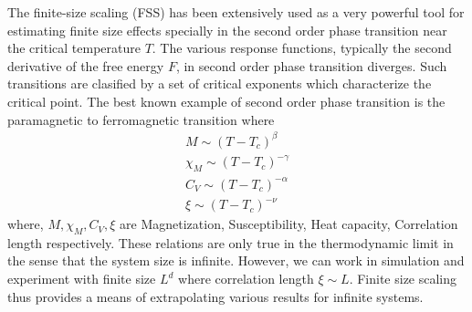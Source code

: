 	The finite-size scaling (FSS) \cite{Elsevier1988} has been extensively used as a very powerful tool for estimating finite size effects specially in the second order phase transition near the critical temperature $T$. The various response functions, typically the second derivative of the free energy $F$, in second order phase transition diverges. Such transitions are clasified by a set of critical exponents which characterize the critical point. The best known example of second order phase transition is the paramagnetic to ferromagnetic transition where
	\begin{align}
		M \sim (T-T_c)^\beta \\
		\chi_M \sim (T-T_c)^{-\gamma} \\
		C_V \sim (T-T_c)^{-\alpha} \\
		\xi \sim (T-T_c)^{-\nu}
	\end{align}
	where, $M, \chi_M, C_V, \xi$ are Magnetization, Susceptibility, Heat capacity, Correlation length respectively. These relations are only true in the thermodynamic limit in the sense that the system size is infinite. However, we can work in simulation and experiment with finite size $L^d$ where correlation length $\xi \sim L$. Finite size scaling thus provides a means of extrapolating various results for infinite systems.
	
